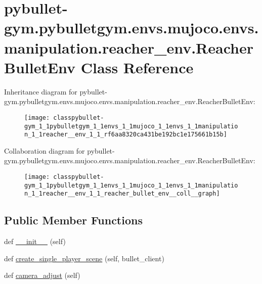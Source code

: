 \hypertarget{classpybullet-gym_1_1pybulletgym_1_1envs_1_1mujoco_1_1envs_1_1manipulation_1_1reacher__env_1_1_reacher_bullet_env}{}\section{pybullet-\/gym.pybulletgym.\+envs.\+mujoco.\+envs.\+manipulation.\+reacher\+\_\+env.\+Reacher\+Bullet\+Env Class Reference}
\label{classpybullet-gym_1_1pybulletgym_1_1envs_1_1mujoco_1_1envs_1_1manipulation_1_1reacher__env_1_1_reacher_bullet_env}


Inheritance diagram for pybullet-\/gym.pybulletgym.\+envs.\+mujoco.\+envs.\+manipulation.\+reacher\+\_\+env.\+Reacher\+Bullet\+Env\+:
\nopagebreak
\begin{figure}[H]
\begin{center}
\leavevmode
\texttt{[image: classpybullet-gym\_1\_1pybulletgym\_1\_1envs\_1\_1mujoco\_1\_1envs\_1\_1manipulation\_1\_1reacher\_\_env\_1\_1\_rf6aa8320ca431be192bc1e175661b15b]}
\end{center}
\end{figure}


Collaboration diagram for pybullet-\/gym.pybulletgym.\+envs.\+mujoco.\+envs.\+manipulation.\+reacher\+\_\+env.\+Reacher\+Bullet\+Env\+:
\nopagebreak
\begin{figure}[H]
\begin{center}
\leavevmode
\texttt{[image: classpybullet-gym\_1\_1pybulletgym\_1\_1envs\_1\_1mujoco\_1\_1envs\_1\_1manipulation\_1\_1reacher\_\_env\_1\_1\_reacher\_bullet\_env\_\_coll\_\_graph]}
\end{center}
\end{figure}
\subsection*{Public Member Functions}
\begin{DoxyCompactItemize}
\item 
def \hyperlink{classpybullet-gym_1_1pybulletgym_1_1envs_1_1mujoco_1_1envs_1_1manipulation_1_1reacher__env_1_1_reacher_bullet_env_a7f2c4c3be08a6e8d04b7bbf378e1d4da}{\+\_\+\+\_\+init\+\_\+\+\_\+} (self)
\item 
def \hyperlink{classpybullet-gym_1_1pybulletgym_1_1envs_1_1mujoco_1_1envs_1_1manipulation_1_1reacher__env_1_1_reacher_bullet_env_a9289e8b6601c8846444ddf094f4164c1}{create\+\_\+single\+\_\+player\+\_\+scene} (self, bullet\+\_\+client)
\item 
def \hyperlink{classpybullet-gym_1_1pybulletgym_1_1envs_1_1mujoco_1_1envs_1_1manipulation_1_1reacher__env_1_1_reacher_bullet_env_a07940a7b2677e6583e025722525fa38b}{camera\+\_\+adjust} (self)
\end{DoxyCompactItemize}
